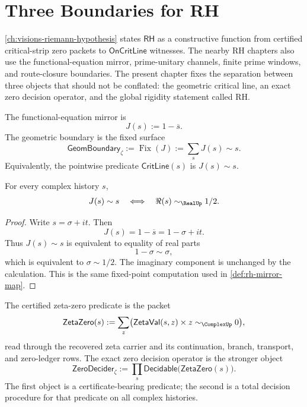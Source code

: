 \chapter{Three Boundaries for RH}
\label{ch:visions-rh-three-boundary-separation}

\autoref{ch:visions-riemann-hypothesis} states $\mathsf{RH}$ as a
constructive function from certified critical-strip zero packets to
$\mathsf{OnCritLine}$ witnesses. The nearby RH chapters also use the
functional-equation mirror, prime-unitary channels, finite prime windows,
and route-closure boundaries. The present chapter fixes the separation
between three objects that should not be conflated: the geometric critical
line, an exact zero decision operator, and the global rigidity statement
called RH.

\begin{definition}
\label{def:rh-three-boundary-mirror-fixed-surface}
The functional-equation mirror is
$$
J(s):=1-\overline{s}.
$$
The geometric boundary is the fixed surface
$$
\mathsf{GeomBoundary}_{\zeta}
:=
\operatorname{Fix}(J)
:=
\sum_s J(s)\sim s.
$$
Equivalently, the pointwise predicate $\mathsf{CritLine}(s)$ is
$J(s)\sim s$.
\end{definition}

\begin{lemma}
\label{lem:rh-mirror-fixed-surface-critical-line}
For every complex history $s$,
$$
J(s)\sim s
\quad\Longleftrightarrow\quad
\Re(s)\sim_{\RealUp}1/2.
$$
\end{lemma}

\begin{proof}
Write $s=\sigma+it$. Then
$$
J(s)=1-\overline{s}=1-\sigma+it.
$$
Thus $J(s)\sim s$ is equivalent to equality of real parts
$$
1-\sigma\sim\sigma,
$$
which is equivalent to $\sigma\sim1/2$. The imaginary component is
unchanged by the calculation. This is the same fixed-point computation used
in \autoref{def:rh-mirror-map}.
\end{proof}

\begin{definition}
\label{def:rh-certified-zero-vs-exact-decider}
The certified zeta-zero predicate is the packet
$$
\mathsf{ZetaZero}(s)
:=
\sum_z
\bigl(
\mathsf{ZetaVal}(s,z)
\times
z\sim_{\ComplexUp}0
\bigr),
$$
read through the recovered zeta carrier and its continuation, branch,
transport, and zero-ledger rows. The exact zero decision operator is the
stronger object
$$
\mathsf{ZeroDecider}_{\zeta}
:=
\prod_s
\mathsf{Decidable}\bigl(\mathsf{ZetaZero}(s)\bigr).
$$
The first object is a certificate-bearing predicate; the second is a total
decision procedure for that predicate on all complex histories.
\end{definition}

